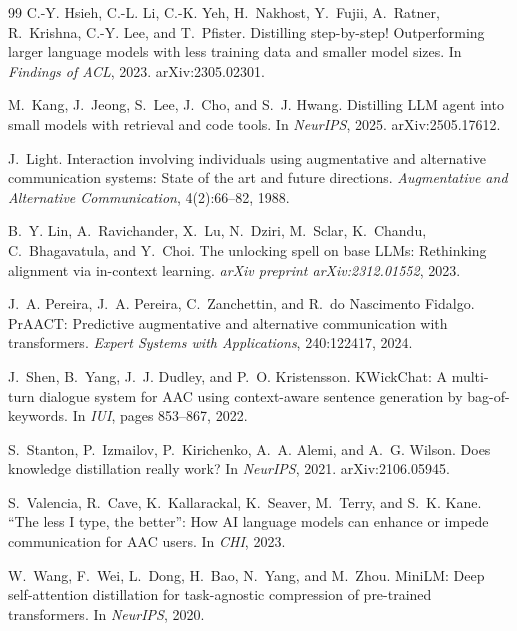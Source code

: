\begin{thebibliography}{99}
C.-Y. Hsieh, C.-L. Li, C.-K. Yeh, H.~Nakhost, Y.~Fujii, A.~Ratner,
R.~Krishna, C.-Y. Lee, and T.~Pfister.
\newblock Distilling step-by-step! Outperforming larger language models
with less training data and smaller model sizes.
\newblock In \emph{Findings of ACL}, 2023. arXiv:2305.02301.

M.~Kang, J.~Jeong, S.~Lee, J.~Cho, and S.~J. Hwang.
\newblock Distilling LLM agent into small models with retrieval and code tools.
\newblock In \emph{NeurIPS}, 2025. arXiv:2505.17612.

J.~Light.
\newblock Interaction involving individuals using augmentative and
alternative communication systems: State of the art and future directions.
\newblock \emph{Augmentative and Alternative Communication}, 4(2):66--82, 1988.

B.~Y. Lin, A.~Ravichander, X.~Lu, N.~Dziri, M.~Sclar, K.~Chandu,
C.~Bhagavatula, and Y.~Choi.
\newblock The unlocking spell on base LLMs: Rethinking alignment via
in-context learning.
\newblock \emph{arXiv preprint arXiv:2312.01552}, 2023.

J.~A. Pereira, J.~A. Pereira, C.~Zanchettin, and R.~do Nascimento Fidalgo.
\newblock PrAACT: Predictive augmentative and alternative communication
with transformers.
\newblock \emph{Expert Systems with Applications}, 240:122417, 2024.

J.~Shen, B.~Yang, J.~J. Dudley, and P.~O. Kristensson.
\newblock KWickChat: A multi-turn dialogue system for AAC using
context-aware sentence generation by bag-of-keywords.
\newblock In \emph{IUI}, pages 853--867, 2022.

S.~Stanton, P.~Izmailov, P.~Kirichenko, A.~A. Alemi, and A.~G. Wilson.
\newblock Does knowledge distillation really work?
\newblock In \emph{NeurIPS}, 2021. arXiv:2106.05945.

S.~Valencia, R.~Cave, K.~Kallarackal, K.~Seaver, M.~Terry, and S.~K. Kane.
\newblock ``The less I type, the better'': How AI language models can
enhance or impede communication for AAC users.
\newblock In \emph{CHI}, 2023.

W.~Wang, F.~Wei, L.~Dong, H.~Bao, N.~Yang, and M.~Zhou.
\newblock MiniLM: Deep self-attention distillation for task-agnostic
compression of pre-trained transformers.
\newblock In \emph{NeurIPS}, 2020.


\end{thebibliography}
